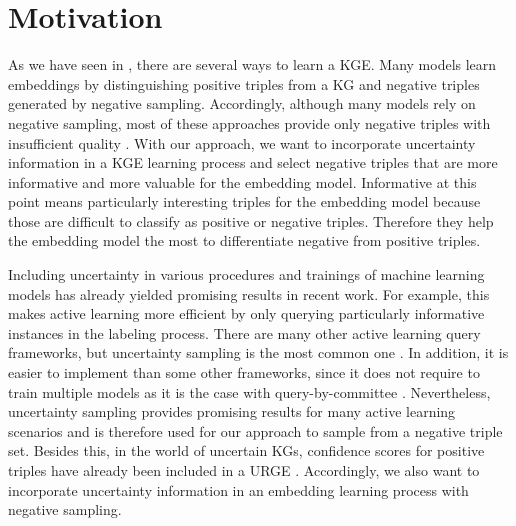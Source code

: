 \section{Motivation} 
\label{sec:motivation}
As we have seen in , there are several ways to learn a \ac{KGE}.
Many models learn embeddings by distinguishing positive triples from a \ac{KG} and negative triples generated by negative sampling.
Accordingly, although many models rely on negative sampling, most of these approaches provide only negative triples with insufficient quality \cite{qiannegative}.
With our approach, we want to incorporate uncertainty information in a \ac{KGE} learning process and select negative triples that are more informative and more valuable for the embedding model.
Informative at this point means particularly interesting triples for the embedding model because those are difficult to classify as positive or negative triples.
Therefore they help the embedding model the most to differentiate negative from positive triples.

Including uncertainty in various procedures and trainings of machine learning models has already yielded promising results in recent work.
For example, this makes active learning more efficient by only querying particularly informative instances in the labeling process.
There are many other active learning query frameworks, but uncertainty sampling is the most common one \cite{Settles2009ActiveLL}.
In addition, it is easier to implement than some other frameworks, since it does not require to train multiple models as it is the case with query-by-committee  \cite{Settles2009ActiveLL}.
Nevertheless, uncertainty sampling provides promising results for many active learning scenarios and is therefore used for our approach to sample from a negative triple set.
Besides this, in the world of uncertain \acp{KG}, confidence scores for positive triples have already been included in a \ac{URGE} \cite{UKGE}.
Accordingly, we also want to incorporate uncertainty information in an embedding learning process with negative sampling.


